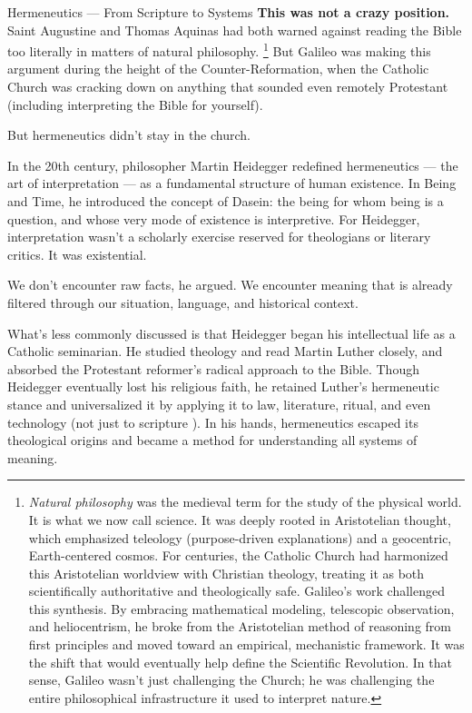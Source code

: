 \begin{PhilosophicalSidebar}{Hermeneutics --- From Scripture to Systems}
    \textbf{This was not a crazy position.} Saint Augustine and Thomas Aquinas had both warned against 
    reading the Bible too literally in matters of natural philosophy.
    \footnote{%
      \textit{Natural philosophy} was the medieval term for the study of the physical world. It is what we now call science. 
      It was deeply rooted in Aristotelian thought, which emphasized teleology (purpose-driven explanations) 
      and a geocentric, Earth-centered cosmos. For centuries, the Catholic Church had harmonized this Aristotelian 
      worldview with Christian theology, treating it as both scientifically authoritative and theologically safe. 
      Galileo’s work challenged this synthesis. By embracing mathematical modeling, telescopic observation, 
      and heliocentrism, he broke from the Aristotelian method of reasoning from first principles and moved toward 
      an empirical, mechanistic framework. It was the shift that would eventually help define the Scientific Revolution. 
      In that sense, Galileo wasn’t just challenging the Church; he was challenging the entire philosophical 
      infrastructure it used to interpret nature.%
    } 
    But Galileo was making this argument 
    during the height of the Counter-Reformation, when the Catholic Church was cracking down on anything 
    that sounded even remotely Protestant (including interpreting the Bible for yourself). 
    
    \medskip
    
    But hermeneutics didn’t stay in the church.
    
    \medskip
    
    In the 20th century, philosopher Martin Heidegger redefined hermeneutics — the art of interpretation — as a 
    fundamental structure of human existence. In Being and Time, he introduced the concept of Dasein: the being for 
    whom being is a question, and whose very mode of existence is interpretive. For Heidegger, interpretation wasn’t 
    a scholarly exercise reserved for theologians or literary critics. It was existential. 

    \medskip
    
    We don’t encounter raw facts, he argued. We encounter meaning that is already filtered through our situation, 
    language, and historical context. 

    \medskip
    
    What’s less commonly discussed is that Heidegger began his intellectual life as 
    a Catholic seminarian. He studied theology and read Martin Luther closely, and absorbed the Protestant reformer’s 
    radical approach to the Bible. Though Heidegger eventually lost his religious faith, he retained Luther’s hermeneutic 
    stance and universalized it by applying it to law, literature, ritual, and even technology (not just to scripture ). 
    In his hands, hermeneutics escaped its theological origins and became a method for understanding all systems of 
    meaning.
    

\end{PhilosophicalSidebar}
